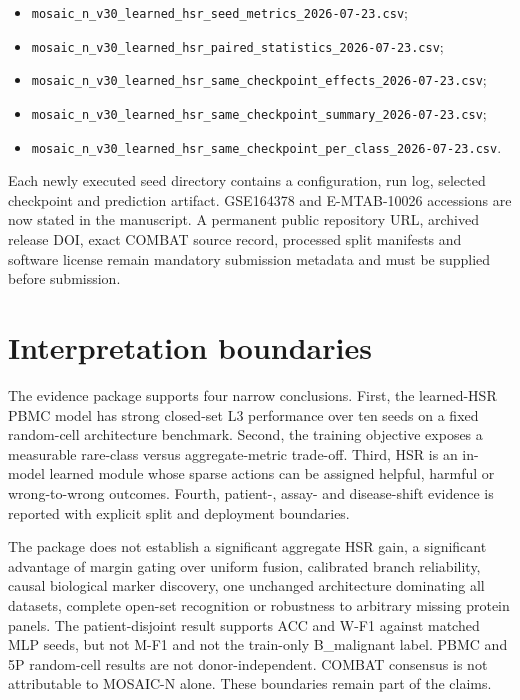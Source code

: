 \documentclass[10pt]{article}
\begin{document}
\begin{itemize}
\item \texttt{mosaic\_n\_v30\_learned\_hsr\_seed\_metrics\_2026-07-23.csv};
\item \texttt{mosaic\_n\_v30\_learned\_hsr\_paired\_statistics\_2026-07-23.csv};
\item \texttt{mosaic\_n\_v30\_learned\_hsr\_same\_checkpoint\_effects\_2026-07-23.csv};
\item \texttt{mosaic\_n\_v30\_learned\_hsr\_same\_checkpoint\_summary\_2026-07-23.csv};
\item \texttt{mosaic\_n\_v30\_learned\_hsr\_same\_checkpoint\_per\_class\_2026-07-23.csv}.
\end{itemize}

Each newly executed seed directory contains a configuration, run log, selected checkpoint and prediction artifact. GSE164378 and E-MTAB-10026 accessions are now stated in the manuscript. A permanent public repository URL, archived release DOI, exact COMBAT source record, processed split manifests and software license remain mandatory submission metadata and must be supplied before submission.

\section{Interpretation boundaries}

The evidence package supports four narrow conclusions. First, the learned-HSR PBMC model has strong closed-set L3 performance over ten seeds on a fixed random-cell architecture benchmark. Second, the training objective exposes a measurable rare-class versus aggregate-metric trade-off. Third, HSR is an in-model learned module whose sparse actions can be assigned helpful, harmful or wrong-to-wrong outcomes. Fourth, patient-, assay- and disease-shift evidence is reported with explicit split and deployment boundaries.

The package does not establish a significant aggregate HSR gain, a significant advantage of margin gating over uniform fusion, calibrated branch reliability, causal biological marker discovery, one unchanged architecture dominating all datasets, complete open-set recognition or robustness to arbitrary missing protein panels. The patient-disjoint result supports ACC and W-F1 against matched MLP seeds, but not M-F1 and not the train-only B\_malignant label. PBMC and 5P random-cell results are not donor-independent. COMBAT consensus is not attributable to MOSAIC-N alone. These boundaries remain part of the claims.
\end{document}
